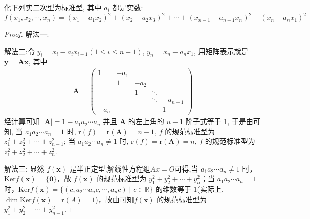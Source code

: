 \documentclass[../../main.tex]{subfiles}%
\begin{document}
\begin{example}\label{example:例8.35}
化下列实二次型为标准型, 其中 \(a_i\) 都是实数:
\[f(x_1,x_2,\cdots,x_n)=(x_1 - a_1x_2)^2+(x_2 - a_2x_3)^2+\cdots+(x_{n - 1} - a_{n - 1}x_n)^2+(x_n - a_nx_1)^2\]
\end{example}
\begin{proof}

{\color{blue}解法一:}

{\color{blue}解法二:}令 \(y_i = x_i - a_ix_{i + 1}(1\leqslant  i\leqslant  n - 1)\), \(y_n = x_n - a_nx_1\), 用矩阵表示就是 \(\boldsymbol{y} = \boldsymbol{A}\boldsymbol{x}\), 其中
\begin{align*}
\boldsymbol{A} = \begin{pmatrix}
1 & -a_1 & & & \\
& 1 & -a_2 & & \\
& & 1 & \ddots & \\
& & & \ddots & -a_{n - 1} \\
-a_n & & & & 1
\end{pmatrix}
\end{align*}
经计算可知 \(|\boldsymbol{A}| = 1 - a_1a_2\cdots a_n\) 并且 \(\boldsymbol{A}\) 的左上角的 \(n - 1\) 阶子式等于 1, 于是由可知, 当 \(a_1a_2\cdots a_n = 1\) 时, \(\mathrm{r}(f)=\mathrm{r}(\boldsymbol{A}) = n - 1\), \(f\) 的规范标准型为 \(z_1^2 + z_2^2 + \cdots + z_{n - 1}^2\); 当 \(a_1a_2\cdots a_n\neq1\) 时, \(\mathrm{r}(f)=\mathrm{r}(\boldsymbol{A}) = n\), \(f\) 的规范标准型为 \(z_1^2 + z_2^2 + \cdots + z_n^2\).

{\color{blue}解法三:}
显然 $f(\boldsymbol{x})$ 是半正定型.解线性方程组$Ax=O$可得,当 $a_1a_2\cdots a_n\neq1$ 时，$\mathrm{Ker} f(\boldsymbol{x}) = \{\boldsymbol{0}\}$，故 $f(\boldsymbol{x})$ 的规范标准型为 $y_1^2 + y_2^2+\cdots + y_n^2$；当 $a_1a_2\cdots a_n = 1$ 时，$\mathrm{Ker} f(\boldsymbol{x})=\{(c,a_2\cdots a_n c,\cdots,a_n c)\mid c\in\mathbb{R}\}$ 的维数等于 $1$(实际上,$\dim \mathrm{Ker} f(\boldsymbol{x})=\mathrm{r}(A)=1$)，故由可知$f(\boldsymbol{x})$ 的规范标准型为 $y_1^2 + y_2^2+\cdots + y_{n - 1}^2$.
\end{proof}
\end{document}
